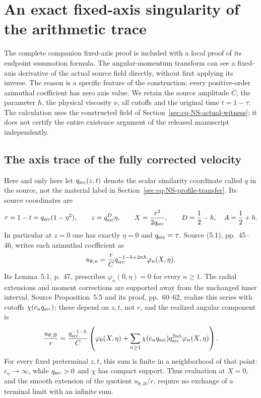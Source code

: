 \section{An exact fixed-axis singularity of the arithmetic trace}
\label{sec:cq-ns-axis-arithmetic-jet}

The complete companion fixed-axis proof \cite{cqNSAxis} is included with a local proof of its endpoint summation formula. The angular-momentum transform can see a fixed-axis derivative of the
actual source field directly, without first applying its inverse. The
reason is a specific feature of the construction: every positive-order
azimuthal coefficient has zero axis value. We retain the source amplitude
\(C\), the parameter \(h\), the physical viscosity \(\nu\), all cutoffs and
the original time \(t=1-\tau\). The calculation uses the constructed
field of Section~\ref{sec:cq-NS-actual-witness}; it does not certify the
entire existence argument of the released manuscript independently.

\subsection{The axis trace of the fully corrected velocity}

Here and only here let \(q_{\rm src}(z,t)\) denote the scalar similarity
coordinate called \(q\) in the source, not the material label in
Section~\ref{sec:cq-NS-profile-transfer}. Its source coordinates are
\[
 \tau=1-t=q_{\rm src}(1-\eta^2),\qquad
 z=q_{\rm src}^{D}\eta,\qquad
 X=\frac{r^2}{2q_{\rm src}},\qquad
 D=\frac12-h,\quad A=\frac12+h.
\]
In particular at \(z=0\) one has exactly \(\eta=0\) and
\(q_{\rm src}=\tau\).
Source (5.1), pp.~45--46, writes each azimuthal coefficient as
\[
 u_{\theta,n}
   =\frac rC q_{\rm src}^{-1-h+2nh}\varphi_n(X,\eta).
\]
Its Lemma~5.1, p.~47, prescribes
\(\varphi_n(0,\eta)=0\) for every \(n\ge1\).
The radial extensions and moment corrections are supported away from
the unchanged inner interval. Source Proposition~5.5 and its proof,
pp.~60--62, realize this series with cutoffs \(\chi(c_nq_{\rm src})\);
these depend on \(z,t\), not \(r\), and the realized angular component is
\begin{equation}\label{eq:cq-naj:base-series}
 \frac{u_{\theta,B}}r
 =\frac{q_{\rm src}^{-1-h}}C
 \left(\varphi_0(X,\eta)+
   \sum_{n\ge1}\chi(c_nq_{\rm src})
                       q_{\rm src}^{2nh}\varphi_n(X,\eta)\right).
\end{equation}
For every fixed preterminal \(z,t\), this sum is finite in a neighborhood
of that point: \(c_n\to\infty\), while \(q_{\rm src}>0\) and \(\chi\)
has compact support. Thus evaluation at \(X=0\), and the smooth extension
of the quotient \(u_{\theta,B}/r\), require no exchange of a terminal
limit with an infinite sum.

